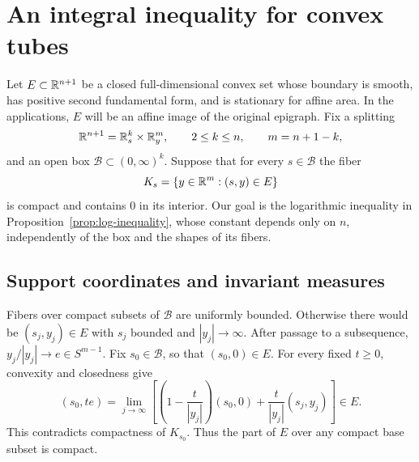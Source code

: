 \section{An integral inequality for convex tubes}\label{sec:tubes}

Let $E\subset\mathbb R^{n+1}$ be a closed full-dimensional convex set whose
boundary is smooth, has positive second fundamental form, and is
stationary for affine area.  In the applications, $E$ will be an affine
image of the original epigraph.  Fix a splitting
\[
 \mathbb R^{n+1}=\mathbb R^k_s\times\mathbb R^m_y,
 \qquad 2\le k\le n,\qquad m=n+1-k,
\]
and an open box $\mathcal B\subset(0,\infty)^k$.  Suppose that for every
$s\in\mathcal B$ the fiber
\[
 K_s=\{y\in\mathbb R^m:(s,y)\in E\}
\]
is compact and contains $0$ in its interior.  Our goal is the logarithmic
inequality in Proposition~\ref{prop:log-inequality}, whose constant depends
only on $n$, independently of the box and the shapes of its fibers.

\subsection{Support coordinates and invariant measures}

Fibers over compact subsets of $\mathcal B$ are uniformly bounded.
Otherwise there would be $(s_j,y_j)\in E$ with $s_j$ bounded and
$|y_j|\to\infty$.  After passage to a subsequence,
$y_j/|y_j|\to e\in S^{m-1}$.  Fix $s_0\in\mathcal B$, so that
$(s_0,0)\in E$.  For every fixed $t\ge0$, convexity and closedness give
\[
 (s_0,te)=\lim_{j\to\infty}
 \left[\left(1-\frac{t}{|y_j|}\right)(s_0,0)
       +\frac{t}{|y_j|}(s_j,y_j)\right]\in E.
\]
This contradicts compactness of $K_{s_0}$.  Thus the part of $E$ over
any compact base subset is compact.

